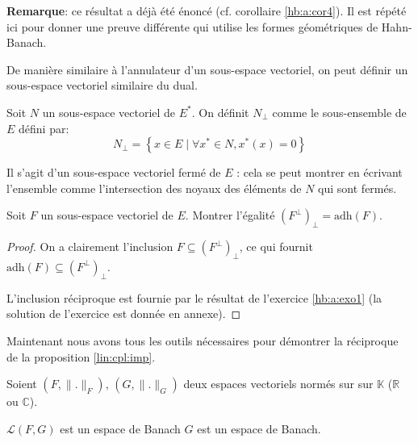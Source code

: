 \textbf{Remarque}: ce résultat a déjà été énoncé (cf. corollaire
\ref{hb:a:cor4}). Il est répété ici pour donner une preuve différente
qui utilise les formes géométriques de Hahn-Banach.

De manière similaire à l'annulateur d'un sous-espace vectoriel, on peut
définir un sous-espace vectoriel similaire du dual.
\begin{df}
  Soit $N$ un sous-espace vectoriel de $E^*$. On définit $N_\perp$
  comme le sous-ensemble de $E$ défini par:
  $$N_\perp = \left\{ x\in E\mid \forall x^*\in N, x^*(x) = 0\right\}$$
\end{df}

Il s'agit d'un sous-espace vectoriel fermé de $E$ : cela se peut montrer
en écrivant l'ensemble comme l'intersection des noyaux des éléments de $N$
qui sont fermés.

\begin{prop}
  Soit $F$ un sous-espace vectoriel de $E$. Montrer l'égalité
  $(F^\perp)_\perp = \mathrm{adh}(F)$.
\end{prop}

\begin{proof}
  On a clairement l'inclusion $F \subseteq (F^\perp)_\perp$, ce qui
  fournit $\mathrm{adh}(F) \subseteq (F^\perp)_\perp$.

  L'inclusion réciproque est fournie par le résultat de l'exercice
  \ref{hb:a:exo1} (la solution de l'exercice est donnée en annexe).
\end{proof}

Maintenant nous avons tous les outils nécessaires pour démontrer la
réciproque de la proposition \ref{lin:cpl:imp}.
\begin{thm}\label{lin:cpl:equ}
  Soient $(F, \|.\|_F)$, $(G, \|.\|_G)$ deux espaces vectoriels normés sur
  sur $\mathbb{K}$ ($\mathbb{R}$ ou $\mathbb{C}$).

  $\mathscr{L}(F, G)$ est un espace de Banach \ssi{} $G$ est un espace
  de Banach.
\end{thm}

